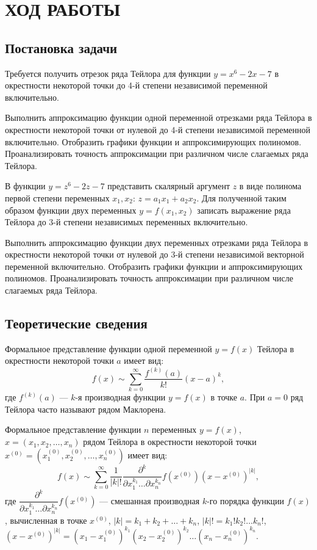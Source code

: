 \section{ХОД РАБОТЫ}

\subsection{Постановка задачи}

Требуется получить отрезок ряда Тейлора для функции $y = x^6 - 2x - 7$ в окрестности
некоторой точки до 4-й степени независимой переменной включительно.

Выполнить аппроксимацию функции одной переменной отрезками ряда Тейлора
в окрестности некоторой точки от нулевой до 4-й степени независимой
переменной включительно. Отобразить графики функции и аппроксимирующих
полиномов. Проанализировать точность аппроксимации при различном числе
слагаемых ряда Тейлора.

В функции $y = z^6 - 2z - 7$ представить скалярный аргумент $z$ в виде
полинома первой степени переменных $x_1, x_2$: $z = a_1x_1 + a_2x_2$.
Для полученной таким образом функции двух переменных $y = f(x_1, x_2)$
записать выражение ряда Тейлора до 3-й степени независимых переменных
включительно. 

Выполнить аппроксимацию функции двух переменных отрезками ряда Тейлора
в окрестности некоторой точки от нулевой до 3-й степени независимой
векторной переменной включительно. Отобразить графики функции и аппроксимирующих
полиномов. Проанализировать точность аппроксимации при различном числе
слагаемых ряда Тейлора.


\subsection{Теоретические сведения}
\label{sub:theory}

Формальное представление функции одной переменной $y=f(x)$ Тейлора в окрестности
некоторой точки $a$ имеет вид:
\begin{equation*}
  f(x) \sim \sum^{\infty}_{k=0} \dfrac{f^{(k)}(a)}{k!} (x-a)^k,
\end{equation*}
где $f^{(k)}(a)$ --- $k$-я производная функции $y=f(x)$ в точке $a$. При $a=0$
ряд Тейлора часто называют рядом Маклорена.

\pagebreak

Формальное представление функции $n$ переменных $y=f(x)$, $x = (x_1,x_2,\dots,x_n)$ 
рядом Тейлора в окрестности некоторой точки 
$x^{(0)} = (x^{(0)}_1, x^{(0)}_2, \dots, x^{(0)}_n)$ имеет вид:
\begin{equation*}
  f(x) \sim \sum^{\infty}_{k=0} \dfrac{ 1 }{ |k|! } \dfrac{ \partial^k }{ \partial x_1^{k_1} \dots \partial x_n^{k_n} } f(x^{(0)}) (x-x^{(0)})^{|k|},
\end{equation*}
где $\dfrac{ \partial^k }{ \partial x_1^{k_1} \dots \partial x_n^{k_n} } f(x^{(0)})$ --- смешанная
производная $k$-го порядка функции $f(x)$, вычисленная в точке $x^{(0)}$, $|k| = k_1 + k_2 + \dots + k_n$,
$|k|! = k_1! k_2! \dots k_n!$, $(x-x^{(0)})^{|k|} = (x_1 - x_1^{(0)})^{k_1} (x_2 - x_2^{(0)})^{k_2} \dots (x_n - x_n^{(0)})^{k_n}$.

